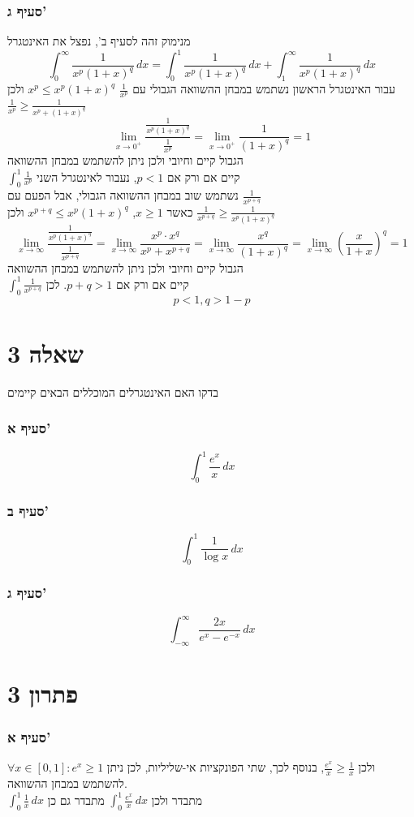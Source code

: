 \documentclass[12pt, titlepage]{article}
\begin{document}
\section*{סעיף ג'}
מנימוק זהה לסעיף ב', נפצל את האינטגרל
\[
	\int_0^\infty \frac{1}{x^p\left(1+x\right)^q}\,dx =\int_0^1 \frac{1}{x^p\left(1+x\right)^q}\,dx + \int_1^\infty \frac{1}{x^p\left(1+x\right)^q}\,dx
\]
עבור האינטגרל הראשון נשתמש במבחן ההשוואה הגבולי עם $\frac{1}{x^p}$
$x^p \leq x^p\left(1+x\right)^q$ ולכן $\frac{1}{x^p} \geq \frac{1}{x^p+\left(1+x\right)^q}$
\[
	\lim_{x\to0^+} \frac{\frac{1}{x^p(1+x)^q}}{\frac{1}{x^p}} =\lim_{x\to0^+} \frac{1}{\left(1+x\right)^q} = 1
\]
הגבול קיים וחיובי ולכן ניתן להשתמש במבחן ההשוואה\\
$\int_0^1 \frac{1}{x^p}$ קיים אם ורק אם $p<1$, נעבור לאינטגרל השני\\
נשתמש שוב במבחן ההשוואה הגבולי, אבל הפעם עם $\frac{1}{x^{p+q}}$\\
כאשר $x\geq 1$, $x^{p+q} \leq x^p(1+x)^q$ ולכן $\frac{1}{x^{p+q}} \geq \frac{1}{x^p\left(1+x\right)^q}$
\[
	\lim_{x\to\infty} \frac{\frac{1}{x^p\left(1+x\right)^q}}{\frac{1}{x^{p+q}}} = \lim_{x\to\infty} \frac{x^{p}\cdot x^{q}}{x^p+ x^{p+q}} = \lim_{x\to\infty} \frac{x^q}{\left(1+x\right)^q} =  \lim_{x\to\infty} \left(\frac{x}{1+x}\right)^q = 1
\]
הגבול קיים וחיובי ולכן ניתן להשתמש במבחן ההשוואה\\
$\int_0^1 \frac{1}{x^{p+q}}$ קיים אם ורק אם $p+q > 1$. לכן
\[
	\boxed{p < 1,  q > 1-p}
\]
\newpage
\part*{שאלה 3}
בדקו האם האינטגרלים המוכללים הבאים קיימים
\section*{סעיף א'}
\[
	\int_0^1 \frac{e^x}{x}\,dx
\]
\section*{סעיף ב'}
\[
	\int_0^1 \frac{1}{\log x}\,dx
\]
\section*{סעיף ג'}
\[
	\int_{-\infty}^\infty \frac{2x}{e^x-e^{-x}}\,dx
\]
\part*{פתרון 3}
\section*{סעיף א'}
$\forall x \in \left[0,1 \right]:e^x \geq 1$ ולכן $\frac{e^x}{x} \geq \frac{1}{x}$, בנוסף לכך, שתי הפונקציות אי-שליליות, לכן ניתן להשתמש במבחן ההשוואה.\\
$\int_0^1 \frac{1}{x}\,dx$ מתבדר ולכן $\int_0^1 \frac{e^x}{x}\,dx$ מתבדר גם כן
\end{document}
